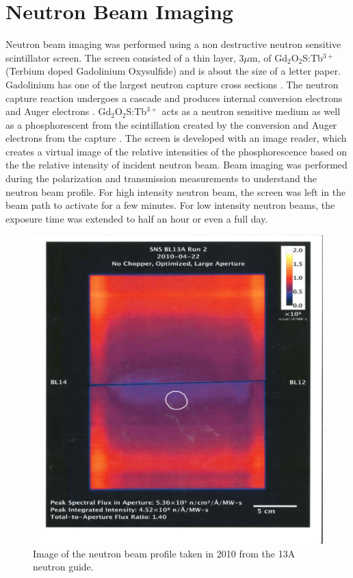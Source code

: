\chapter{Neutron Beam Imaging}
\label{app:beamimg}

Neutron beam imaging was performed using a non destructive neutron sensitive scintillator screen. The screen consisted of a thin layer, 3$\mu$m, of Gd$_2$O$_2$S:Tb$^{3+}$ (Terbium doped Gadolinium Oxysulfide) \cite{Crha2019, Trtik2015} and is about the size of a letter paper. Gadolinium has one of the largest neutron capture cross sections \cite{Chadwick2011, Mughabghab1981}. The neutron capture reaction undergoes a cascade and produces internal conversion electrons and Auger electrons \cite{Chadwick2011, Mughabghab1981, Greenwood1978}. Gd$_2$O$_2$S:Tb$^{3+}$ acts as a neutron sensitive medium as well as a phosphorescent from the scintillation created by the conversion and Auger electrons from the capture \cite{Crha2019, Trtik2015}. The screen is developed with an image reader, which creates a virtual image of the relative intensities of the phosphorescence based on the the relative intensity of incident neutron beam. Beam imaging was performed during the polarization and transmission measurements to understand the neutron beam profile. For high intensity neutron beam, the screen was left in the beam path to activate for a few minutes. For low intensity neutron beams, the exposure time was extended to half an hour or even a full day. 

\begin{figure}[h!]
\centering
\includegraphics[width=\textwidth]{figures/appendix-figs/beamimageplate.png}
\caption{Image of the neutron beam profile taken in 2010 from the 13A neutron guide.}
\label{fig:beam_image}
\end{figure}

